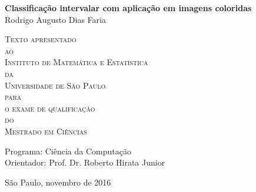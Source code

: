 \documentclass[11pt,twoside,a4paper]{book}
\theoremstyle{plain}
\theoremstyle{definition}
\begin{document}
\frontmatter 
\fancyhead[RO]{{\footnotesize\rightmark}\hspace{2em}\thepage}
\setcounter{tocdepth}{2}
\fancyhead[LE]{\thepage\hspace{2em}\footnotesize{\leftmark}}
\fancyhead[RE,LO]{}
\fancyhead[RO]{{\footnotesize\rightmark}\hspace{2em}\thepage}

\onehalfspacing  %

\thispagestyle{empty}
\begin{center}
    \vspace*{2.3cm}
    \textbf{\Large{Classificação intervalar com aplicação em imagens coloridas}}\\
    
    \vspace*{1.2cm}
    \Large{Rodrigo Augusto Dias Faria}
    
    \vskip 2cm
    \textsc{
    Texto apresentado\\[-0.25cm] 
    ao\\[-0.25cm]
    Instituto de Matemática e Estatística\\[-0.25cm]
    da\\[-0.25cm]
    Universidade de São Paulo\\[-0.25cm]
    para\\[-0.25cm]
    o exame de qualificação\\[-0.25cm]
    do\\[-0.25cm]
    Mestrado em Ciências}
    
    \vskip 1.5cm
    Programa: Ciência da Computação\\
    Orientador: Prof. Dr. Roberto Hirata Junior

    
    \vskip 1.5cm %
    \normalsize{São Paulo, novembro de 2016}
\end{center}

%
%
%
\end{document}
